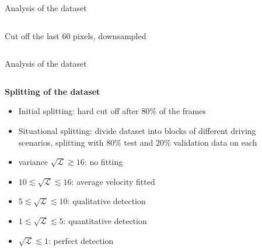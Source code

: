 \begin{frame}{Analysis of the dataset}
\begin{columns}[t]
\begin{column}{.45\textwidth}
\begin{center}
{				\small{Cut off the last 60 pixels, downsampled}}
			\end{center}
		\end{column}
	\end{columns}
\end{frame}

\begin{frame}{Analysis of the dataset}
	\begin{columns}[c]
		\begin{column}{.55\textwidth}
			\textbf{Splitting of the dataset}
			\begin{itemize}
				\item<+-> Initial splitting: hard cut off after $80\%$ of the frames
				\item<+-> Situational splitting: divide dataset into blocks of different driving scenarios,
				splitting with $80\%$ test and $20\%$ validation data on each
			\end{itemize}
			\begin{itemize}
				\item<+-> variance $\sqrt{\mathcal{L}} \gtrsim 16$: no fitting
				\item<+-> $10 \lesssim \sqrt{\mathcal{L}} \lesssim 16$: average velocity fitted
				\item<+-> $5 \lesssim \sqrt{\mathcal{L}} \lesssim 10$: qualitative detection
				\item<+-> $1 \lesssim \sqrt{\mathcal{L}} \lesssim 5$: quantitative detection
				\item<+-> $\sqrt{\mathcal{L}} \lesssim 1$: perfect detection
			\end{itemize}
		\end{column}
		\begin{column}{.45\textwidth}
			\begin{center}
\end{center}
\end{column}
\end{columns}
\end{frame}
